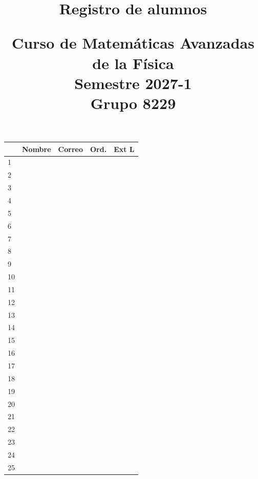 \documentclass[11pt]{article}
\title{Registro de alumnos \\ \begin{large}Curso de Matemáticas Avanzadas de la Física \\ Semestre 2027-1   \\ Grupo 8229 \end{large}}
\author{}
\date{ }
\begin{document}
\maketitle
\fontsize{12}{12}\selectfont

\vspace*{-2cm}

\begin{longtable}{| l | >{\centering\arraybackslash}m{7cm}| >{\centering\arraybackslash}m{5cm} | c | c |}
\hline
 & Nombre & Correo & Ord. & Ext L \\
\endhead
\hline 1 & & & & \\
\hline 2 & & & &  \\
\hline 3 & & & &  \\
\hline 4 & & & &  \\
\hline 5 & & & &  \\
\hline 6 & & & &  \\
\hline 7 & & & &  \\
\hline 8 & & & &  \\
\hline 9 & & & &  \\
\hline 10 & & & &  \\
\hline 11 & & & &  \\
\hline 12 & & & &  \\
\hline 13 & & & &  \\
\hline 14 & & & &  \\
\hline 15 & & & &  \\
\hline 16 & & & &  \\
\hline 17 & & & &  \\
\hline 18 & & & &  \\
\hline 19 & & & &  \\
\hline 20 & & & &  \\
\hline 21 & & & &  \\
\hline 22 & & & &  \\
\hline 23 & & & &  \\
\hline 24 & & & &  \\
\hline 25 & & & &  \\
\hline
\end{longtable}
\end{document}
